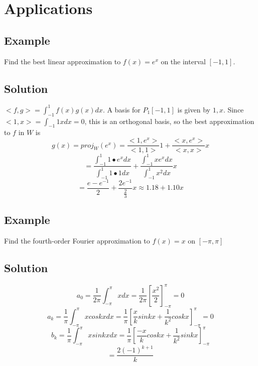 \section{Applications}
\subsection*{Example}
Find the best linear approximation to $f(x) = e^x$ on the interval $[-1, 1]$.
\subsection*{Solution}
$<f,g> = \int_{-1}^{1} f(x)g(x) dx$. A basis for $P_1[-1,1]$ is given by ${1,x}$.
Since $<1,x> = \int_{-1}{1} x dx = 0$, this is an orthogonal basis, so the best approximation to $f$ in $W$ is
$$g(x) = proj_W(e^x) = \frac{<1,e^x>}{<1,1>}1 + \frac{<x,e^x>}{<x,x>}x$$
$$= \frac{\int_{-1}^{1}1\bullet e^x dx}{\int_{-1}^{1}1\bullet 1 dx} + \frac{\int_{-1}^{1}xe^x dx}{\int_{-1}^{1}x^2 dx}x$$
$$= \frac{e-e^{-1}}{2} + \frac{2e^{-1}}{\frac{2}{3}}x \approx 1.18 + 1.10x$$
\subsection*{Example}
Find the fourth-order Fourier approximation to $f(x) = x$ on $ [-\pi, \pi]$
\subsection*{Solution}
$$a_0 = \frac{1}{2\pi}\int_{-\pi}^{\pi} x dx = \frac{1}{2\pi}[\frac{x^2}{2}]^\pi_{-\pi} = 0$$
$$a_k = \frac{1}{\pi}\int_{-\pi}^{\pi} xcoskx dx = \frac{1}{\pi}[\frac{x}{k}sinkx + \frac{1}{k^2}coskx]^\pi_{-\pi} = 0$$
$$b_k = \frac{1}{\pi}\int_{-\pi}^{\pi} x sinkx dx = \frac{1}{\pi}[\frac{-x}{k}cos kx + \frac{1}{k^2}sinkx]^\pi_{-\pi}$$
$$= \frac{2(-1)^{k+1}}{k}$$